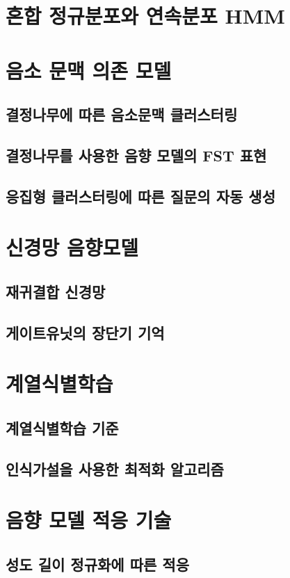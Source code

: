 \documentclass{book}
\begin{document}
\section{혼합 정규분포와 연속분포 HMM}
\section{음소 문맥 의존 모델}
\label{sec:context-dependant-model}
\subsection{결정나무에 따른 음소문맥 클러스터링}
\subsection{결정나무를 사용한 음향 모델의 FST 표현}
\subsection{응집형 클러스터링에 따른 질문의 자동 생성}

\section{신경망 음향모델}
\subsection{재귀결합 신경망}
\subsection{게이트유닛의 장단기 기억}

\section{계열식별학습}
\subsection{계열식별학습 기준}
\subsection{인식가설을 사용한 최적화 알고리즘}

\section{음향 모델 적응 기술}
\subsection{성도 길이 정규화에 따른 적응}
\end{document}
